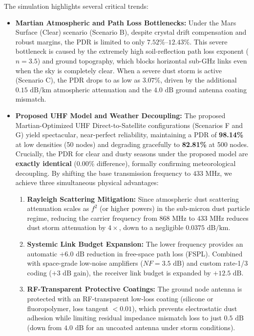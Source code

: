 \documentclass[journal,10pt,doublecolumn]{IEEEtran}
\begin{document}
The simulation highlights several critical trends:
\begin{itemize}
    \item \textbf{Martian Atmospheric and Path Loss Bottlenecks:} Under the Mars Surface (Clear) scenario (Scenario B), despite crystal drift compensation and robust margins, the PDR is limited to only $7.52\%$--$12.43\%$. This severe bottleneck is caused by the extremely high soil-reflection path loss exponent ($n = 3.5$) and ground topography, which blocks horizontal sub-GHz links even when the sky is completely clear. When a severe dust storm is active (Scenario C), the PDR drops to as low as $3.07\%$, driven by the additional $0.15\text{ dB/km}$ atmospheric attenuation and the $4.0\text{ dB}$ ground antenna coating mismatch.
    \item \textbf{Proposed UHF Model and Weather Decoupling:} The proposed Martian-Optimized UHF Direct-to-Satellite configurations (Scenarios F and G) yield spectacular, near-perfect reliability, maintaining a PDR of \textbf{98.14\%} at low densities (50 nodes) and degrading gracefully to \textbf{82.81\%} at 500 nodes. Crucially, the PDR for clear and dusty seasons under the proposed model are \textbf{exactly identical} (0.00\% difference), formally confirming meteorological decoupling. By shifting the base transmission frequency to $433\text{ MHz}$, we achieve three simultaneous physical advantages:
    \begin{enumerate}
        \item \textbf{Rayleigh Scattering Mitigation:} Since atmospheric dust scattering attenuation scales as $f^2$ (or higher powers) in the sub-micron dust particle regime, reducing the carrier frequency from $868\text{ MHz}$ to $433\text{ MHz}$ reduces dust storm attenuation by $4\times$, down to a negligible $0.0375\text{ dB/km}$.
        \item \textbf{Systemic Link Budget Expansion:} The lower frequency provides an automatic $+6.0\text{ dB}$ reduction in free-space path loss (FSPL). Combined with space-grade low-noise amplifiers ($NF = 3.5\text{ dB}$) and custom rate-1/3 coding ($+3\text{ dB}$ gain), the receiver link budget is expanded by $+12.5\text{ dB}$.
        \item \textbf{RF-Transparent Protective Coatings:} The ground node antenna is protected with an RF-transparent low-loss coating (silicone or fluoropolymer, loss tangent $< 0.01$), which prevents electrostatic dust adhesion while limiting residual impedance mismatch loss to just $0.5\text{ dB}$ (down from $4.0\text{ dB}$ for an uncoated antenna under storm conditions).

\end{enumerate}
\end{itemize}
\end{document}
